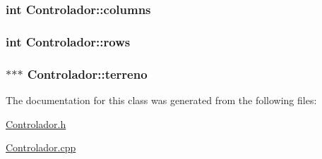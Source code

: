 \subsubsection[{\texorpdfstring{columns}{columns}}]{\setlength{\rightskip}{0pt plus 5cm}int Controlador\+::columns\hspace{0.3cm}{\ttfamily [static]}}\hypertarget{classControlador_a2a6b739b562f1c4d295be0e48069c521}{}\label{classControlador_a2a6b739b562f1c4d295be0e48069c521}
\subsubsection[{\texorpdfstring{rows}{rows}}]{\setlength{\rightskip}{0pt plus 5cm}int Controlador\+::rows\hspace{0.3cm}{\ttfamily [static]}}\hypertarget{classControlador_af6022ee9e2d20a9d2469df3e91d78029}{}\label{classControlador_af6022ee9e2d20a9d2469df3e91d78029}
\subsubsection[{\texorpdfstring{terreno}{terreno}}]{ $\ast$$\ast$$\ast$ Controlador\+::terreno\hspace{0.3cm}{\ttfamily [static]}}\hypertarget{classControlador_a70fb7805ac5552e9ee36d7d3d0653fa2}{}\label{classControlador_a70fb7805ac5552e9ee36d7d3d0653fa2}


The documentation for this class was generated from the following files\+:\begin{DoxyCompactItemize}
\item 
\hyperlink{Controlador_8h}{Controlador.\+h}\item 
\hyperlink{Controlador_8cpp}{Controlador.\+cpp}\end{DoxyCompactItemize}
